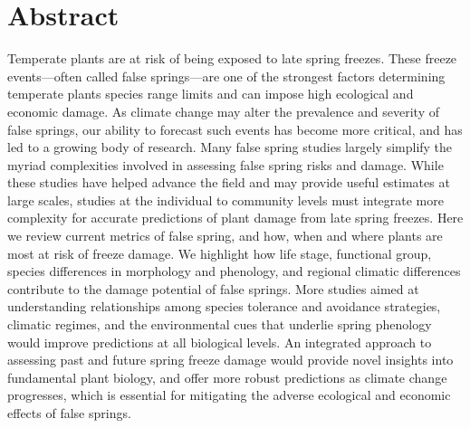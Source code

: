 \documentclass{article}\usepackage[]{graphicx}\usepackage[]{color}
\begin{document}
\section*{Abstract} %
Temperate plants are at risk of being exposed to late spring freezes. These freeze events---often called false springs---are one of the strongest factors determining temperate plants species range limits and can impose high ecological and economic damage. As climate change may alter the prevalence and severity of false springs, our ability to forecast such events has become more critical, and has led to a growing body of research. Many false spring studies largely simplify the myriad complexities involved in assessing false spring risks and damage. While these studies have helped advance the field and may provide useful estimates at large scales, studies at the individual to community levels must integrate more complexity for accurate predictions of plant damage from late spring freezes. Here we review current metrics of false spring, and how, when and where plants are most at risk of freeze damage. We highlight how life stage, functional group, species differences in morphology and phenology, and regional climatic differences contribute to the damage potential of false springs. More studies aimed at understanding relationships among species tolerance and avoidance strategies, climatic regimes, and the environmental cues that underlie spring phenology would improve predictions at all biological levels. An integrated approach to assessing past and future spring freeze damage would provide novel insights into fundamental plant biology, and offer more robust predictions as climate change progresses, which is essential for mitigating the adverse ecological and economic effects of false springs. 


\end{document}
